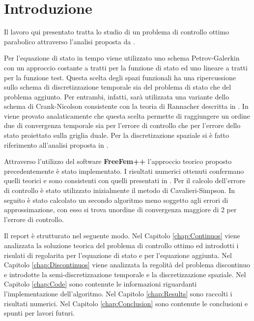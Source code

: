 \section{Introduzione}
Il lavoro qui presentato tratta lo studio di un problema di controllo ottimo parabolico attraverso l'analisi proposta da \cite{MAIN}.
\par\medskip
Per l'equazione di stato in tempo viene utilizzato uno schema Petrov-Galerkin con un approccio costante a tratti per la funzione di stato ed uno lineare a tratti per la funzione test. Questa scelta degli spazi funzionali ha una ripercussione sullo schema di discretizzazione temporale sia del problema di stato che del problema aggiunto. Per entrambi, infatti, sarà utilizzata una variante dello schema di Crank-Nicolson consistente con la teoria di Rannacher descritta in \cite{Ran84}.
In \cite{MAIN} viene provato analaticamente che questa scelta permette di raggiungere un ordine due di convergenza temporale sia per l'errore di controllo che per l'errore dello stato proiettato sulla griglia duale.
Per la discretizazione spaziale si è fatto riferimento all'analisi proposta in \cite{MV11}.
\par\medskip
Attraverso l'utilizzo del software \textbf{FreeFem++} l'approccio teorico proposto precedentemente è stato implementato. I risultati numerici ottenuti confermano quelli teorici e sono consistenti con quelli presentati in \cite{MAIN}. Per il calcolo dell'errore di controllo è stato utilizzato inizialmente il metodo di Cavalieri-Simpson. In seguito è stato calcolato un secondo algoritmo meno soggetto agli errori di approssimazione, con esso si trova unordine di convergenza maggiore di 2 per l'errore di controllo.
\par\medskip
Il report è strutturato nel seguente modo. Nel Capitolo \ref{chap:Continuos} viene analizzata la soluzione teorica del problema di controllo ottimo ed introdotti i risulati di regolarita per l'equazione di stato e per l'equazione aggiunta. Nel Capitolo \ref{chap:Discontinuos} viene analizzata la regolità del problema discontinuo e introdotte la semi-discretizzazione temporale e la discretizzazione spaziale. Nel Capitolo \ref{chap:Code} sono contenute le informazioni riguardanti l'implementazione dell'algoritmo. Nel Capitolo \ref{chap:Results} sono raccolti i risultati numerici. Nel Capitolo \ref{chap:Conclusion} sono contenute le conclusioni e spunti per lavori futuri.
